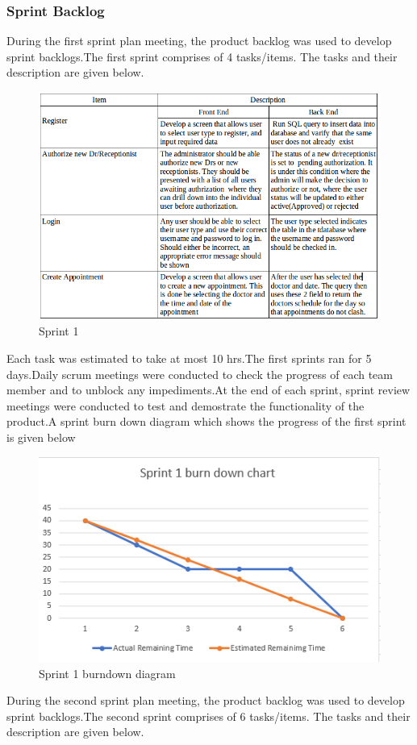 \documentclass[12pt]{article}
\begin{document}
  \subsubsection{Sprint Backlog}
During the first sprint plan meeting, the product backlog was used to develop sprint backlogs.The first sprint comprises of 4 tasks/items. The tasks and their description are given below.
\begin{figure}[h]
    \centering
    \includegraphics[width=\linewidth]{final.png}
    \caption{Sprint 1}
    \label{fig:ERD}
    \end{figure}

\newpage
Each task was estimated to take at most 10 hrs.The first sprints ran for 5 days.Daily scrum meetings were conducted to check the progress of each team member and to unblock any impediments.At the end of each sprint,  sprint review meetings were conducted to test and demostrate the functionality of the product.A sprint burn down diagram which shows the progress of the first sprint is given below 
\begin{figure}[h]
    \centering
    \includegraphics[width=\linewidth]{sprint1.PNG}
    \caption{Sprint 1 burndown diagram}
    \label{fig:ERD}
\end{figure}
    \newpage
During the second sprint plan meeting, the product backlog was used to develop sprint backlogs.The second sprint comprises of  6 tasks/items. The tasks and their description are given below.
\end{document}
